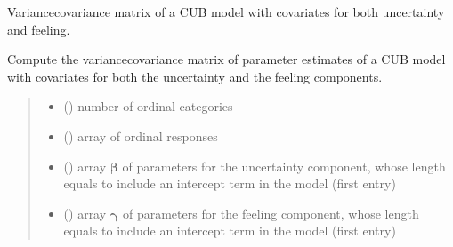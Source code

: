 \documentclass[letterpaper,10pt,english]{sphinxmanual}
\begin{document}
\begin{fulllineitems}
\label{\detokenize{cubmods:cubmods.cub_yw.varcov}}
\pysigstartsignatures
{}
\pysigstopsignatures
\sphinxAtStartPar
Variance\sphinxhyphen{}covariance matrix of a CUB model with covariates for both uncertainty and feeling.

\sphinxAtStartPar
Compute the variance\sphinxhyphen{}covariance matrix of parameter estimates of a CUB model with covariates for
both the uncertainty and the feeling components.
\begin{quote}\begin{description}
\begin{itemize}
\item {} 
\sphinxAtStartPar
{} () \textendash{} number of ordinal categories

\item {} 
\sphinxAtStartPar
{} () \textendash{} array of ordinal responses

\item {} 
\sphinxAtStartPar
{} () \textendash{} array \(\pmb \beta\) of parameters for the uncertainty component, whose length equals 
 to include an intercept term in the model (first entry)

\item {} 
\sphinxAtStartPar
{} () \textendash{} array \(\pmb \gamma\) of parameters for the feeling component, whose length equals 
 to include an intercept term in the model (first entry)


\end{itemize}
\end{description}
\end{quote}
\end{fulllineitems}
\end{document}
